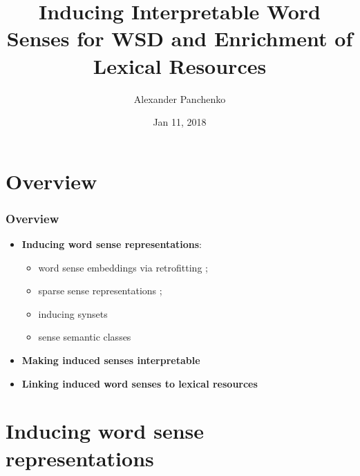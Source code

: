\documentclass{beamer}
\title{Inducing Interpretable Word Senses for WSD and Enrichment of Lexical Resources}
\author{Alexander Panchenko} %
\date[11.02.2018]{Jan 11, 2018}
\begin{document}
\maketitle


\section{Overview}

\begin{frame}
  \frametitle{Overview}

  \begin{itemize}
		\item \textbf{Inducing word sense representations}:
		\begin{itemize}
		\item word sense embeddings via retrofitting \cite{pelevina-EtAl:2016:RepL4NLP,remus:2018};
		\item sparse sense representations \cite{panchenko-EtAl:2017:EACLlong};
		\item inducing synsets~\cite{ustalov-panchenko-biemann:2017:Long}
		\item sense semantic classes \cite{panchenko:2018:SemanticClasses} 
		\end{itemize}
		
	\pause 
	\vspace{1em}
	\item \textbf{Making induced senses interpretable} \cite{panchenko-EtAl:2017:EMNLP2017Demos,panchenko-EtAl:2017:EACLlong}
	
	\pause
	\vspace{1em}
	\item \textbf{Linking induced word senses to lexical resources}~\cite{faralli2016linked,panchenko-EtAl:2017:SENSE2017,biemann2018framework}	
			
\end{itemize}
	
\end{frame}

\section{Inducing word sense representations}
\end{document}
